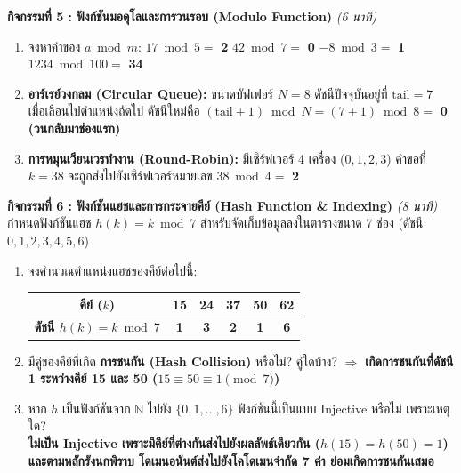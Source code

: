 \documentclass[a4paper,12pt]{article}
\newcommand{\ans}[1]{\textbf{\color{ans}#1}}
\begin{document}
\noindent\textbf{กิจกรรมที่ 5 : ฟังก์ชันมอดุโลและการวนรอบ (Modulo Function)} \hfill \textit{(6 นาที)}
\begin{enumerate}[label=\arabic*)]
  \item จงหาค่าของ $a \bmod m$:
        \enskip $17 \bmod 5 =$ \ans{2}
        \enskip $42 \bmod 7 =$ \ans{0}
        \enskip $-8 \bmod 3 =$ \ans{1}
        \enskip $1234 \bmod 100 =$ \ans{34}
  \item \textbf{อาร์เรย์วงกลม (Circular Queue):} ขนาดบัฟเฟอร์ $N = 8$ ดัชนีปัจจุบันอยู่ที่ $\text{tail} = 7$\\
        เมื่อเลื่อนไปตำแหน่งถัดไป ดัชนีใหม่คือ $(\text{tail} + 1) \bmod N = (7 + 1) \bmod 8 =$ \ans{0} \ans{(วนกลับมาช่องแรก)}
  \item \textbf{การหมุนเวียนเวรทำงาน (Round-Robin):} มีเซิร์ฟเวอร์ 4 เครื่อง ($0, 1, 2, 3$) คำขอที่ $k = 38$ จะถูกส่งไปยังเซิร์ฟเวอร์หมายเลข $38 \bmod 4 =$ \ans{2}
\end{enumerate}
\vspace{0.2em}

\noindent\textbf{กิจกรรมที่ 6 : ฟังก์ชันแฮชและการกระจายคีย์ (Hash Function \& Indexing)} \hfill \textit{(8 นาที)}\\
กำหนดฟังก์ชันแฮช $h(k) = k \bmod 7$ สำหรับจัดเก็บข้อมูลลงในตารางขนาด 7 ช่อง (ดัชนี $0, 1, 2, 3, 4, 5, 6$)
\begin{enumerate}[label=\arabic*)]
  \item จงคำนวณตำแหน่งแฮชของคีย์ต่อไปนี้:
        \begin{center}
        \small
        \begin{tabular}{|c|c|c|c|c|c|}
        \hline
        \textbf{คีย์ ($k$)} & 15 & 24 & 37 & 50 & 62 \\ \hline
        \textbf{ดัชนี $h(k) = k \bmod 7$} & \ans{1} & \ans{3} & \ans{2} & \ans{1} & \ans{6} \\ \hline
        \end{tabular}
        \end{center}
  \item มีคู่ของคีย์ที่เกิด \textbf{การชนกัน (Hash Collision)} หรือไม่? คู่ใดบ้าง? $\Rightarrow$ \ans{เกิดการชนกันที่ดัชนี 1 ระหว่างคีย์ 15 และ 50 ($15 \equiv 50 \equiv 1 \pmod 7$)}
  \item หาก $h$ เป็นฟังก์ชันจาก $\mathbb{N}$ ไปยัง $\{0, 1, \ldots, 6\}$ ฟังก์ชันนี้เป็นแบบ Injective หรือไม่ เพราะเหตุใด?\\[0.15em]
        \ans{ไม่เป็น Injective เพราะมีคีย์ที่ต่างกันส่งไปยังผลลัพธ์เดียวกัน ($h(15)=h(50)=1$) และตามหลักรังนกพิราบ โดเมนอนันต์ส่งไปยังโคโดเมนจำกัด 7 ค่า ย่อมเกิดการชนกันเสมอ}
\end{enumerate}
\vspace{0.2em}
\end{document}
